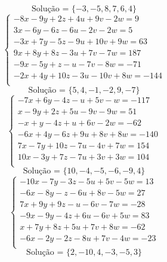 \documentclass[12pt,oneside,a4paper]{article}
\begin{document}
\begin{equation*}
\text{Solução = }\{-3,-5,8,7,6,4\}
\end{equation*}
\vspace{\baselineskip}
\begin{equation*}
\begin{cases}
-8x-9y+2z+4u+9v-2w=9 \\
3x-6y-6z-6u-2v-2w=5 \\
-3x+7y-5z-9u+10v+9w=63 \\
9x+8y+8z-3u+7v-7w=187 \\
-9x-5y+z-u-7v-8w=-71 \\
-2x+4y+10z-3u-10v+8w=-144 \\
\end{cases}
\end{equation*}
\begin{equation*}
\text{Solução = }\{5,4,-1,-2,9,-7\}
\end{equation*}
\vspace{\baselineskip}
\begin{equation*}
\begin{cases}
-7x+6y-4z-u+5v-w=-117 \\
x-9y+2z+5u-9v-9w=51 \\
-x+y-4z+u+6v-2w=-62 \\
-6x+4y-6z+9u+8v+8w=-140 \\
7x-7y+10z-7u-4v+7w=154 \\
10x-3y+7z-7u+3v+3w=104 \\
\end{cases}
\end{equation*}
\begin{equation*}
\text{Solução = }\{10,-4,-5,-6,-9,4\}
\end{equation*}
\vspace{\baselineskip}
\begin{equation*}
\begin{cases}
-10x-7y-3z-5u+5v-5w=13 \\
-6x-8y-z-6u+8v-5w=27 \\
7x+9y+9z-u-6v-7w=-28 \\
-9x-9y-4z+6u-6v+5w=83 \\
x+7y+8z+5u+7v+8w=-62 \\
-6x-2y-2z-8u+7v-4w=-23 \\
\end{cases}
\end{equation*}
\begin{equation*}
\text{Solução = }\{2,-10,4,-3,-5,3\}
\end{equation*}
\end{document}
